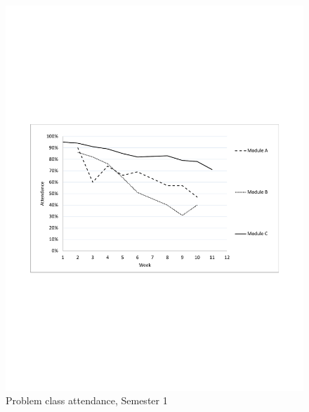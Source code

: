 \documentclass{amsart}
\begin{document}
\begin{center}
\begin{figure}[hbt]
\includegraphics[bb=50 250 562 545,width=1\textwidth]{figure2.pdf}
\caption{Problem class attendance, Semester 1}
\end{figure}
\end{center}
\end{document}
